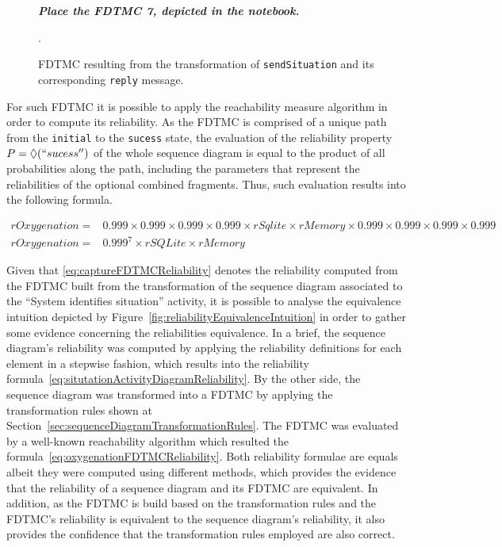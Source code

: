 \begin{figure} 
	\textbf{\textit{Place the FDTMC 7, depicted in the notebook.}}
	\caption{FDTMC resulting from the transformation of
		\texttt{sendSituation} and its corresponding \texttt{reply}
		message.}
	\label{fig:fdtmcReplyPersist}.
\end{figure}









For such FDTMC it is possible to apply the reachability measure
algorithm\cite{baier_principles_2008} in order to compute its
reliability\cite{grunske_specification_2008}. As
the FDTMC is comprised of a unique path from the \texttt{initial} to the
\texttt{sucess} state, the evaluation of the reliability property
$P=\Diamond(``sucess'')$ of the whole sequence diagram is equal to the
product of all probabilities along the path, including the parameters that
represent the reliabilities of the optional combined fragments.
Thus, such evaluation results into the following formula.

\scriptsize
\begin{align}
rOxygenation =&0.999 \times 0.999 \times 0.999 \times 0.999 \times rSqlite \times
rMemory \times 0.999 \times 0.999 \times 0.999 \times 0.999 \nonumber \\
rOxygenation =&0.999^7 \times rSQLite \times rMemory
\label{eq:oxygenationFDTMCReliability}
\end{align}
\normalsize

Given that \ref{eq:captureFDTMCReliability} denotes the reliability computed
from the FDTMC built from the transformation of the sequence diagram associated
to the ``System identifies situation'' activity, it is possible to analyse the
equivalence intuition depicted by
Figure~\ref{fig:reliabilityEquivalenceIntuition} in order to gather some
evidence concerning the reliabilities equivalence. In a brief, the sequence
diagram's reliability was computed by applying the reliability definitions for
each element in a stepwise fashion, which results into the reliability
formula~\ref{eq:situtationActivityDiagramReliability}. By the other side, the
sequence diagram was transformed into a FDTMC by applying the transformation
rules shown at Section~\ref{sec:sequenceDiagramTransformationRules}. The FDTMC
was evaluated by a well-known reachability algorithm which resulted the
formula~\ref{eq:oxygenationFDTMCReliability}. Both reliability formulae are
equals albeit they were computed using different methods, which provides the
evidence that the reliability of a sequence diagram and its FDTMC are
equivalent. In addition, as the FDTMC is build based on the transformation rules
and the FDTMC's reliability is equivalent to the sequence diagram's reliability,
it also provides the confidence that the transformation rules employed are also
correct.

